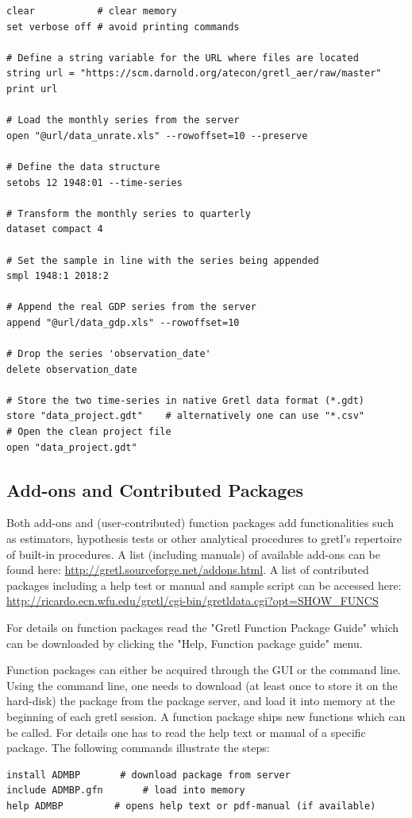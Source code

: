 \documentclass[11pt]{article}
\begin{document}
\begin{Verbatim}[baselinestretch=0.75, frame=single, fontsize=\small]
clear			# clear memory
set verbose off	# avoid printing commands

# Define a string variable for the URL where files are located
string url = "https://scm.darnold.org/atecon/gretl_aer/raw/master"
print url

# Load the monthly series from the server
open "@url/data_unrate.xls" --rowoffset=10 --preserve

# Define the data structure
setobs 12 1948:01 --time-series

# Transform the monthly series to quarterly
dataset compact 4

# Set the sample in line with the series being appended
smpl 1948:1 2018:2

# Append the real GDP series from the server
append "@url/data_gdp.xls" --rowoffset=10

# Drop the series 'observation_date'
delete observation_date

# Store the two time-series in native Gretl data format (*.gdt)
store "data_project.gdt"	# alternatively one can use "*.csv"
# Open the clean project file
open "data_project.gdt"
\end{Verbatim}


\subsection{Add-ons and Contributed Packages}
Both add-ons and (user-contributed) function packages add functionalities such as estimators, hypothesis tests or other analytical procedures to gretl's repertoire of built-in procedures. A list (including manuals) of available add-ons can be found here: \url{http://gretl.sourceforge.net/addons.html}. A list of contributed packages including a help test or manual and sample script can be accessed here: \url{http://ricardo.ecn.wfu.edu/gretl/cgi-bin/gretldata.cgi?opt=SHOW_FUNCS}

For details on function packages read the "Gretl Function Package Guide" which can be downloaded by clicking the "Help, Function package guide" menu.

Function packages can either be acquired through the GUI or the command line. Using the command line, one needs to download (at least once to store it on the hard-disk) the package from the package server, and load it into memory at the beginning of each gretl session. A function package ships new functions which can be called. For details one has to read the help text or manual of a specific package. The following commands illustrate the steps:
\begin{Verbatim}[baselinestretch=0.75, frame=single, fontsize=\small]
install ADMBP		# download package from server
include ADMBP.gfn	    # load into memory
help ADMBP		   # opens help text or pdf-manual (if available)
\end{Verbatim}
\end{document}
